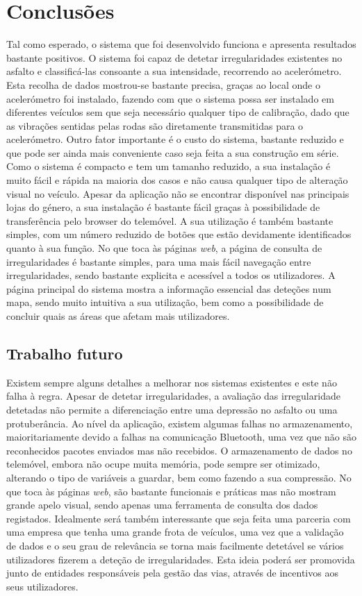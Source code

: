 \chapter{Conclusões}
\label{conclusoes}

Tal como esperado, o sistema que foi desenvolvido funciona e apresenta resultados bastante positivos.
O sistema foi capaz de detetar irregularidades existentes no asfalto e classificá-las consoante a sua intensidade, recorrendo ao acelerómetro.
Esta recolha de dados mostrou-se bastante precisa, graças ao local onde o acelerómetro foi instalado, fazendo com que o sistema possa ser instalado em diferentes veículos sem que seja necessário qualquer tipo de calibração, dado que as vibrações sentidas pelas rodas são diretamente transmitidas para o acelerómetro.
Outro fator importante é o custo do sistema, bastante reduzido e que pode ser ainda mais conveniente caso seja feita a sua construção em série.
Como o sistema é compacto e tem um tamanho reduzido, a sua instalação é muito fácil e rápida na maioria dos casos e não causa qualquer tipo de alteração visual no veículo.
Apesar da aplicação não se encontrar disponível nas principais lojas do género, a sua instalação é bastante fácil graças à possibilidade de transferência pelo browser do telemóvel.
A sua utilização é também bastante simples, com um número reduzido de botões que estão devidamente identificados quanto à sua função.
No que toca às páginas \emph{web}, a página de consulta de irregularidades é bastante simples, para uma mais fácil navegação entre irregularidades, sendo bastante explicita e acessível a todos os utilizadores.
A página principal do sistema mostra a informação essencial das deteções num mapa, sendo muito intuitiva a sua utilização, bem como a possibilidade de concluir quais as áreas que afetam mais utilizadores.

\section{Trabalho futuro}
\label{sec:trabalho_futuro}

Existem sempre alguns detalhes a melhorar nos sistemas existentes e este não falha à regra.
Apesar de detetar irregularidades, a avaliação das irregularidade detetadas não permite a diferenciação entre uma depressão no asfalto ou uma protuberância.
Ao nível da aplicação, existem algumas falhas no armazenamento, maioritariamente devido a falhas na comunicação Bluetooth, uma vez que não são reconhecidos pacotes enviados mas não recebidos.
O armazenamento de dados no telemóvel, embora não ocupe muita memória, pode sempre ser otimizado, alterando o tipo de variáveis a guardar, bem como fazendo a sua compressão.
No que toca às páginas \emph{web}, são bastante funcionais e práticas mas não mostram grande apelo visual, sendo apenas uma ferramenta de consulta dos dados registados.
Idealmente será também interessante que seja feita uma parceria com uma empresa que tenha uma grande frota de veículos, uma vez que a validação de dados e o seu grau de relevância se torna mais facilmente detetável se vários utilizadores fizerem a deteção de irregularidades.
Esta ideia poderá ser promovida junto de entidades responsáveis pela gestão das vias, através de incentivos aos seus utilizadores.